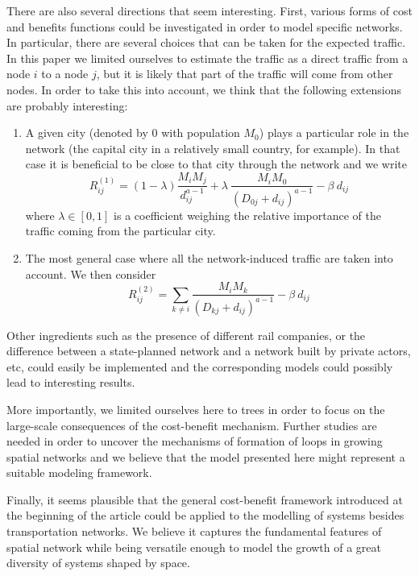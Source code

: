 There are also several directions that seem interesting. First, various forms of cost and benefits functions could be investigated in order to model specific networks. In particular, there are several choices that can be taken for the expected traffic. In this paper we limited ourselves to estimate the traffic as a direct traffic from a node $i$ to a node $j$, but it is likely that part of the traffic will come from other nodes. In order to take this into account, we think that the following extensions are probably interesting:
\begin{enumerate}
\item A given city (denoted by $0$ with population $M_0$) plays a particular role in the network (the capital city in a relatively small country, for example). In that case it is beneficial to be close to that city through the network and we write
\begin{equation}
\label{eq:R1}
R^{(1)}_{ij} = (1-\lambda)\frac{M_i M_j}{d_{ij}^{a-1}}  + \lambda \: \frac{M_i M_0}{\left(D_{0j} + d_{ij}\right)^{a-1}}- \beta \: d_{ij}
\end{equation}
where $\lambda \in \left[ 0,1 \right]$ is a coefficient weighing the relative importance of the traffic coming from the particular city.
\item The most general case where all the network-induced traffic are taken into account. We then consider
\begin{equation}
\label{eq:R2}
R^{(2)}_{ij} = \sum_{k \neq i}\frac{M_i M_k}{\left(D_{kj} + d_{ij}\right)^{a-1}}- \beta \: d_{ij}
\end{equation}
\end{enumerate} 
Other ingredients such as the presence of different rail companies, or the difference between a state-planned network and a network built by private actors, etc, could easily be implemented and the corresponding models could possibly lead to interesting results.

More importantly, we limited ourselves here to trees in order to focus on the large-scale consequences of the cost-benefit mechanism. Further studies are needed in order to uncover the mechanisms of formation of loops in growing spatial networks and we believe that the model presented here might represent a suitable modeling framework.

Finally, it seems plausible that the general cost-benefit framework introduced at the beginning of the article could be applied to the modelling of systems besides transportation networks. We believe it captures the fundamental features of spatial network while being versatile enough to model the growth of a great diversity of systems shaped by space.


